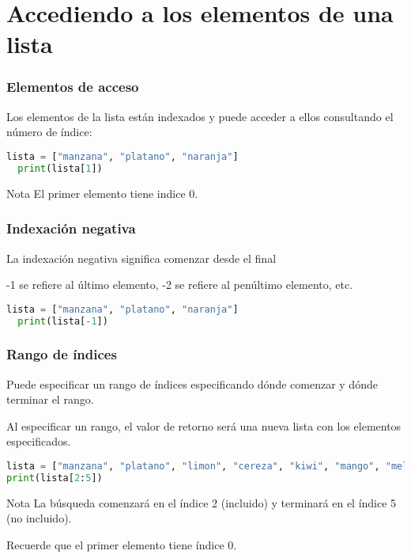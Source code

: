 \section{Accediendo a los elementos de una lista}

\begin{frame}[fragile]
  \frametitle{Elementos de acceso}

  Los elementos de la lista están indexados y puede acceder
  a ellos consultando el número de índice:

  \vspace{\baselineskip}
  \begin{lstlisting}[language=Python]
  lista = ["manzana", "platano", "naranja"]
  print(lista[1]) 
  \end{lstlisting}

  \begin{exampleblock}{Nota}
    El primer elemento tiene indice 0.
  \end{exampleblock}
\end{frame}

\begin{frame}[fragile]
  \frametitle{Indexación negativa}

  La indexación negativa significa comenzar desde el final

  \vspace{\baselineskip}
  -1 se refiere al último elemento, -2 se refiere al penúltimo elemento, etc.

  \vspace{\baselineskip}
  \begin{lstlisting}[language=Python]
  lista = ["manzana", "platano", "naranja"]
  print(lista[-1]) 
  \end{lstlisting}
\end{frame}

\begin{frame}[fragile]
  \frametitle{Rango de índices}

  Puede especificar un rango de índices especificando
  dónde comenzar y dónde terminar el rango.

  \vspace{\baselineskip}
  Al especificar un rango, el valor de retorno será una nueva
  lista con los elementos especificados.

  \vspace{\baselineskip}
  \begin{lstlisting}[language=Python]
lista = ["manzana", "platano", "limon", "cereza", "kiwi", "mango", "melon"]
print(lista[2:5]) 
  \end{lstlisting}

  \pausa
  \begin{alertblock}{Nota}
    La búsqueda comenzará en el índice 2 (incluido)
    y terminará en el índice 5 (no incluido). 

    Recuerde que el primer elemento tiene índice 0.
  \end{alertblock}
\end{frame}

